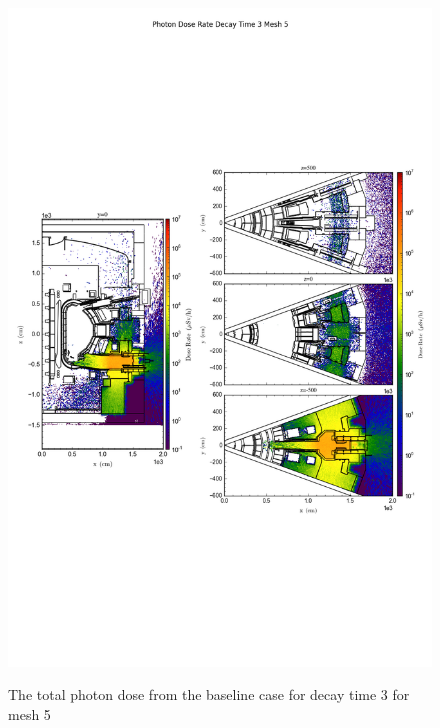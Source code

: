 \begin{figure}[ht!]
\centering
\includegraphics[trim={0cm 9cm 0cm 10cm},clip,scale=0.75]{../plots/final_model/Photon_Dose_Rate_Decay_Time_3_Mesh_5.png}
\label{fig:photons_dc3_no4bc_m5_flux}
\caption{The total photon dose from the baseline case for decay time 3 for mesh 5}
\end{figure}
